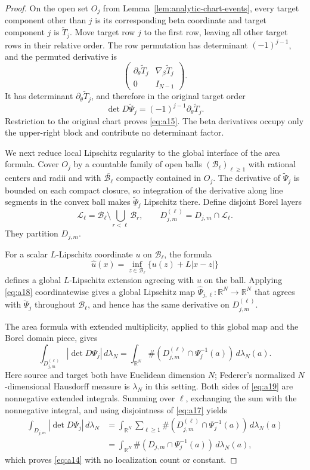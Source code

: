 \begin{proof}
On the open set $O_j$ from Lemma~\ref{lem:analytic-chart-events}, every
target component other than $j$ is its corresponding beta coordinate and
target component $j$ is $\widetilde T_j$.  Move target row $j$ to the first
row, leaving all other target rows in their relative order.  The row
permutation has determinant $(-1)^{j-1}$, and the permuted derivative is
\[
\begin{pmatrix}
\partial_\theta\widetilde T_j&\nabla_\beta\widetilde T_j\\
0&I_{N-1}
\end{pmatrix}.
\]
It has determinant $\partial_\theta\widetilde T_j$, and therefore in the
original target order
\[
\det D\widetilde\Psi_j
=(-1)^{j-1}\partial_\theta\widetilde T_j.
\]
Restriction to the original chart proves \eqref{eq:a15}.  The beta
derivatives occupy only the upper-right block and contribute no determinant
factor.

We next reduce local Lipschitz regularity to the global interface of the
area formula.  Cover $O_j$ by a countable family of open balls
$(\mathcal B_\ell)_{\ell\geq1}$ with rational centers and radii and with
$\overline{\mathcal B_\ell}$ compactly contained in $O_j$.  The derivative
of $\widetilde\Psi_j$ is bounded on each compact closure, so integration of
the derivative along line segments in the convex ball makes
$\widetilde\Psi_j$ Lipschitz there.  Define disjoint Borel layers
\[
\mathcal L_\ell
=\mathcal B_\ell\setminus\bigcup_{r<\ell}\mathcal B_r,
\qquad
D_{j,m}^{(\ell)}=D_{j,m}\cap\mathcal L_\ell.
\tag{A17}\label{eq:a17}
\]
They partition $D_{j,m}$.

For a scalar $L$-Lipschitz coordinate $u$ on $\mathcal B_\ell$, the formula
\[
\widehat u(x)=\inf_{z\in\mathcal B_\ell}
\{u(z)+L|x-z|\}
\tag{A18}\label{eq:a18}
\]
defines a global $L$-Lipschitz extension agreeing with $u$ on the ball.
Applying \eqref{eq:a18} coordinatewise gives a global Lipschitz map
$\widehat\Psi_{j,\ell}:\mathbb R^N\to\mathbb R^N$ that agrees with
$\widetilde\Psi_j$ throughout $\mathcal B_\ell$, and hence has the same
derivative on $D_{j,m}^{(\ell)}$.

The area formula with extended multiplicity, applied to this global map and
the Borel domain piece, gives
\citep[Section~3.2.3, p.~243]{Federer1969}
\[
\int_{D_{j,m}^{(\ell)}}|\det D\Psi_j|\,d\lambda_N
=\int_{\mathbb R^N}
\#(D_{j,m}^{(\ell)}\cap\Psi_j^{-1}(a))\,d\lambda_N(a).
\tag{A19}\label{eq:a19}
\]
Here source and target both have Euclidean dimension $N$; Federer's
normalized $N$-dimensional Hausdorff measure is $\lambda_N$ in this
setting.  Both sides of \eqref{eq:a19} are nonnegative extended integrals.
Summing over $\ell$, exchanging the sum with the nonnegative integral, and
using disjointness of \eqref{eq:a17} yields
\[
\begin{aligned}
\int_{D_{j,m}}|\det D\Psi_j|\,d\lambda_N
&=\int_{\mathbb R^N}\sum_{\ell\geq1}
 \#(D_{j,m}^{(\ell)}\cap\Psi_j^{-1}(a))\,d\lambda_N(a)\\
&=\int_{\mathbb R^N}
 \#(D_{j,m}\cap\Psi_j^{-1}(a))\,d\lambda_N(a),
\end{aligned}
\]
which proves \eqref{eq:a14} with no localization count or constant.


\end{proof}
